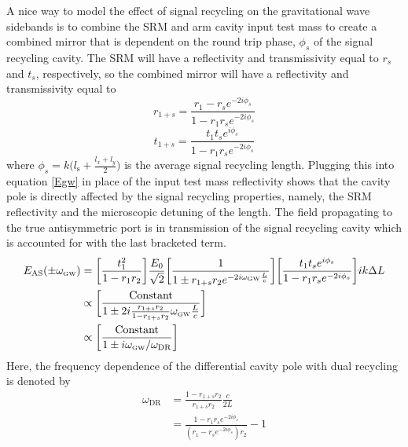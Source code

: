 		A nice way to model the effect of signal recycling on the gravitational wave sidebands is to combine the SRM and  arm cavity input test mass to create a combined  mirror that is dependent on the round trip phase, $\phi_s$ of the signal recycling cavity.  The SRM will have a reflectivity and transmissivity equal to $r_s$ and $t_s$, respectively, so the combined mirror will have a reflectivity and transmissivity equal to
		\begin{equation}
		r_{1+s} = \frac{r_1 - r_s e^{-2i\phi_s}}{1- r_1 r_s e^{-2i\phi_s}}
		\end{equation}
		\begin{equation}
		t_{1+s} = \frac{t_1 t_s e^{i\phi_s}}{1- r_1 r_s e^{-2i\phi_s}}
		\end{equation}
		where $\phi_s = k \big( l_\text{s} + \frac{l_x + l_y}{2} \big)	$ is the average signal recycling length.
		Plugging this into equation \ref{Egw} in place of the input test mass reflectivity shows that the cavity pole is directly affected by the signal recycling properties, namely, the SRM reflectivity and the microscopic detuning of the length. The field propagating to the true antisymmetric port is in transmission of the signal recycling cavity which is accounted for with the last bracketed term. 
		\begin{equation}
		\begin{aligned}
		E_{\text{AS}}(\pm \omega_{\text{\tiny GW}}) & =  \bigg[ \frac{t_1^2}{1-r_1 r_2}\bigg]  \frac{E_0}{\sqrt{2}} \bigg[\frac{ 1}{1 \pm r_{1+s} r_2 e^{-2i  \omega_{\text{\tiny GW}}  \frac{L}{c}}} \bigg] \bigg[\frac{t_1 t_s e^{i\phi_s}}{1- r_1 r_s e^{-2i\phi_s}}\bigg] ik\Delta L\\
		& \propto \bigg[ \frac{ \text{Constant}}{1 \pm 2 i \frac{r_{1+s} r_2}{1- r_{1+s} r_2}  \omega_{\text{\tiny GW}}  \frac{L}{c}}  \bigg]\\
		& \propto \bigg[\frac{\text{Constant}}{1 \pm i \omega_{\text{\tiny GW}}/\omega_{\text{DR}}}\bigg]
		\end{aligned}
		\end{equation}
		Here, the frequency dependence of the differential cavity pole with dual recycling is denoted by
		\begin{equation}
		\begin{aligned}
			\omega_{\text{DR}} 	&=	\frac{1-r_{1+s}r_2}{r_{1+s}r_2}\frac{c}{2L}\\
								&=	\frac{1- r_1r_s e^{-2i\phi_s} }{ (r_1 - r_s e^{-2i\phi_s})r_2} - 1
		\end{aligned}
		\end{equation}
		
